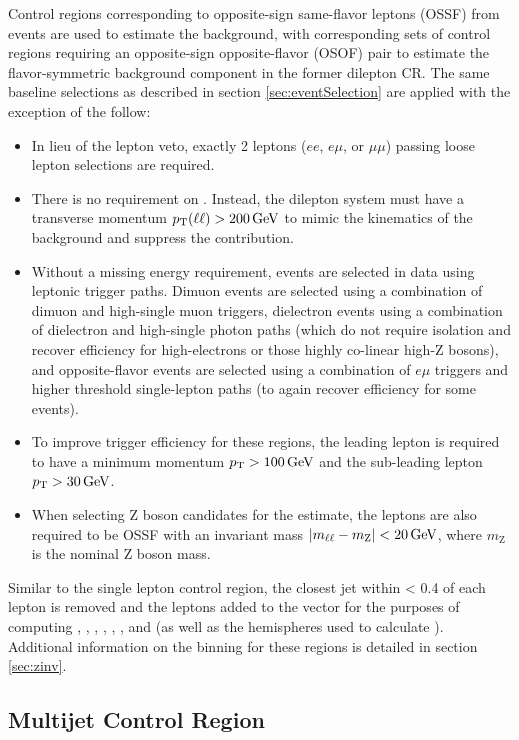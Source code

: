 Control regions corresponding to opposite-sign same-flavor leptons (OSSF) from \zll events are used to estimate the \znunu background, with corresponding sets of control regions requiring an opposite-sign opposite-flavor (OSOF) pair to estimate the flavor-symmetric background component in the former dilepton CR. The same baseline selections as described in section \ref{sec:eventSelection} are applied with the exception of the follow:
\begin{itemize}
	\item In lieu of the lepton veto, exactly 2 leptons ($ee$, $e\mu$, or $\mu\mu$) passing loose lepton selections are required.
	\item There is no requirement on \MET. Instead, the dilepton system must have a transverse momentum $p_{\mathrm{T}}(\ell\ell) > 200\,\text{Ge\hspace{-.08em}V}$ to mimic the kinematics of the \znunu background and suppress the \ttbar contribution.
	\item Without a missing energy requirement, events are selected in data using leptonic trigger paths. Dimuon events are selected using a combination of dimuon and high-\pt single muon triggers, dielectron events using a combination of dielectron and high-\pt single photon paths (which do not require isolation and recover efficiency for high-\pt electrons or those highly co-linear high-\pt Z bosons), and opposite-flavor events are selected using a combination of $e\mu$ triggers and higher threshold single-lepton paths (to again recover efficiency for some events).
	\item To improve trigger efficiency for these regions, the leading lepton is required to have a minimum momentum $p_{\mathrm{T}} > 100\,\text{Ge\hspace{-.08em}V}$ and the sub-leading lepton $p_{\mathrm{T}} > 30\,\text{Ge\hspace{-.08em}V}$.
	\item When selecting Z boson candidates for the \znunu estimate, the leptons are also required to be OSSF with an invariant mass $|m_{\ell\ell} - m_{\mathrm{Z}}| < 20\,\text{Ge\hspace{-.08em}V}$, where $m_{\mathrm{Z}}$ is the nominal Z boson mass.
\end{itemize}
Similar to the single lepton control region, the closest jet within \DR < 0.4 of each lepton is removed and the leptons added to the \MET vector for the purposes of computing \nj, \nb, \Ht, \Htmiss, \dphilong, \htovermet, and \mttwo (as well as the hemispheres used to calculate \mttwo). Additional information on the \mttwo binning for these regions is detailed in section \ref{sec:zinv}.

\subsection{Multijet Control Region}
\label{subsec:multijetCR}

